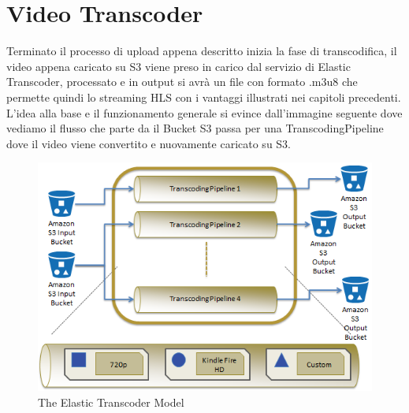 \section{Video Transcoder}
\label{sec:video_transcoder}


Terminato il processo di upload appena descritto inizia la fase di transcodifica, il video appena caricato su S3 viene preso in carico dal servizio di Elastic Transcoder, processato e in output si avrà un file con formato .m3u8 che permette quindi lo streaming HLS con i vantaggi illustrati nei capitoli precedenti. L’idea alla base e il funzionamento generale si evince dall’immagine seguente dove vediamo il flusso che parte da il Bucket S3 passa per una TranscodingPipeline dove il video viene convertito e nuovamente caricato su S3. 

\begin{figure}[htb]
 \centering
 \includegraphics[width=1.0\linewidth]{images/chapter6/elastic_transcode_model.png}\hfill
 \caption[The Elastic Transcoder Model]{The Elastic Transcoder Model}
 \label{fig:fourV}
\end{figure}

